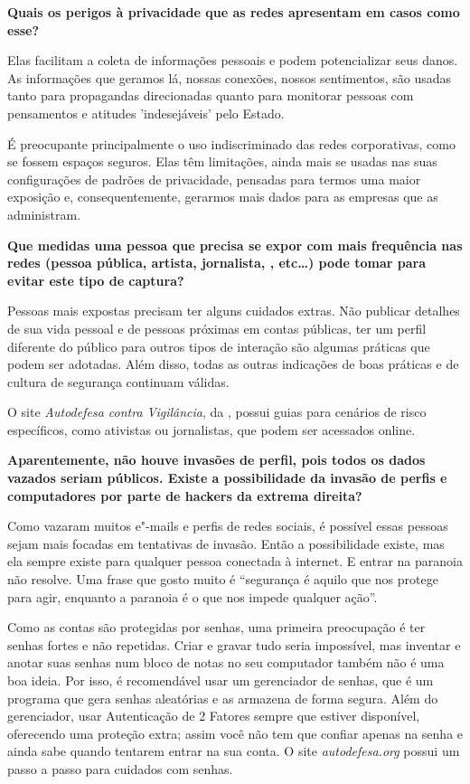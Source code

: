 \bigskip

\noindent{}\textbf{Quais os perigos à privacidade que as redes apresentam em casos
como esse?}

Elas facilitam a coleta de informações pessoais e
podem potencializar seus danos. As informações que geramos lá, nossas
conexões, nossos sentimentos, são usadas tanto para propagandas
direcionadas quanto para monitorar pessoas com pensamentos e atitudes
'indesejáveis' pelo Estado.

É preocupante principalmente o uso indiscriminado das redes
corporativas, como se fossem espaços seguros. Elas têm limitações, ainda
mais se usadas nas suas configurações de padrões de privacidade,
pensadas para termos uma maior exposição e, consequentemente, gerarmos
mais dados para as empresas que as administram.

\bigskip

\noindent{}\textbf{Que medidas uma pessoa que precisa se expor com mais frequência
nas redes (pessoa pública, artista, jornalista, , etc\ldots{}) pode tomar
para evitar este tipo de captura?}

Pessoas mais expostas precisam ter alguns cuidados
extras. Não publicar detalhes de sua vida pessoal e de pessoas próximas
em contas públicas, ter um perfil diferente do público para outros tipos
de interação são algumas práticas que podem ser adotadas. Além disso,
todas as outras indicações de boas práticas e de cultura de segurança
continuam válidas.

O site \emph{Autodefesa contra
Vigilância}, da , possui guias para cenários de risco
específicos, como ativistas ou jornalistas, que podem ser acessados
online.

\bigskip

\noindent{}\textbf{Aparentemente, não houve invasões de perfil, pois todos os dados
vazados seriam públicos. Existe a possibilidade da invasão de perfis e
computadores por parte de hackers da extrema direita?}

Como vazaram muitos e"-mails e perfis de redes
sociais, é possível essas pessoas sejam mais focadas em tentativas de
invasão. Então a possibilidade existe, mas ela sempre existe para
qualquer pessoa conectada à internet. E entrar na paranoia não resolve.
Uma frase que gosto muito é ``segurança é aquilo que nos protege para
agir, enquanto a paranoia é o que nos impede qualquer ação''.

Como as contas são protegidas por senhas, uma primeira preocupação é ter
senhas fortes e não repetidas. Criar e gravar tudo seria impossível, mas
inventar e anotar suas senhas num bloco de notas no seu computador
também não é uma boa ideia. Por isso, é recomendável usar um gerenciador
de senhas, que é um programa que gera senhas aleatórias e as armazena de
forma segura. Além do gerenciador, usar Autenticação de 2 Fatores sempre
que estiver disponível, oferecendo uma proteção extra; assim você não
tem que confiar apenas na senha e ainda sabe quando tentarem entrar na
sua conta. O site \emph{autodefesa.org} possui
um passo a passo
para cuidados com senhas.

